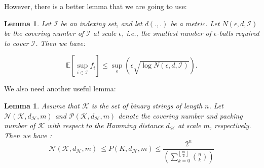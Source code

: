 \documentclass{article}
\theoremstyle{plain}
\newtheorem{lemma}[theorem]{Lemma}
\theoremstyle{definition}
\theoremstyle{remark}
\begin{document}
However, there is a better lemma that we are going to use:

\begin{lemma}
Let \( \mathcal{I} \) be an indexing set, and let \( d(.,.) \) be a metric. Let \( N(\epsilon, d, \mathcal{I}) \) be the covering number of \( \mathcal{I} \) at scale \( \epsilon \), i.e., the smallest number of \( \epsilon \)-balls required to cover \( \mathcal{I} \). Then we have:

\[
\mathbb{E} \left[ \sup_{i \in \mathcal{I}} f_i \right] \leq \sup_{\epsilon} \left( \epsilon \sqrt{\log N(\epsilon, d, \mathcal{I})} \right).
\]

\end{lemma}

We also need another useful lemma:
\begin{lemma}
Assume that \( \mathcal{K} \) is the set of binary strings of length \( n \). Let \( \mathcal{N}(\mathcal{K}, d_\mathcal{H}, m) \) and 
\( \mathcal{P}(\mathcal{K}, d_\mathcal{H}, m) \)
denote the covering number and packing number of \( \mathcal{K} \) with respect to the Hamming distance \( d_\mathcal{H} \) at scale \( m \), respectively.
Then we have :
\begin{equation*}
    \mathcal{N}(\mathcal{K},d_\mathcal{H}, m)\ \leq 
    P(K, d_\mathcal{H}, m)  \leq \frac{2^n}{\left( \sum_{k=0}^{\left\lfloor \frac{m}{2} \right\rfloor} \binom{n}{k} \right)}  
\end{equation*}
\end{lemma}
\end{document}
